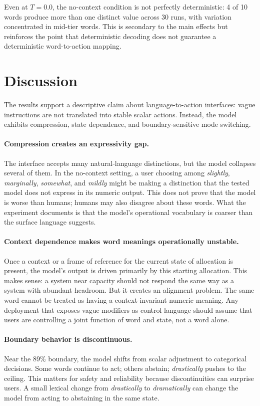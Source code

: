 \documentclass[11pt]{article}
\begin{document}
Even at $T{=}0.0$, the no-context condition is not perfectly deterministic: 4 of 10 words produce more than one distinct value across 30 runs, with variation concentrated in mid-tier words. This is secondary to the main effects but reinforces the point that deterministic decoding does not guarantee a deterministic word-to-action mapping.

\section{Discussion}

The results support a descriptive claim about language-to-action interfaces: vague instructions are not translated into stable scalar actions. Instead, the model exhibits compression, state dependence, and boundary-sensitive mode switching.

\paragraph{Compression creates an expressivity gap.}
The interface accepts many natural-language distinctions, but the model collapses several of them. In the no-context setting, a user choosing among \textit{slightly}, \textit{marginally}, \textit{somewhat}, and \textit{mildly} might be making a distinction that the tested model does not express in its numeric output. This does not prove that the model is worse than humans; humans may also disagree about these words. What the experiment documents is that the model's operational vocabulary is coarser than the surface language suggests.

\paragraph{Context dependence makes word meanings operationally unstable.}
Once a context or a frame of reference for the current state of allocation is present, the model's output is driven primarily by this starting allocation. This makes sense: a system near capacity should not respond the same way as a system with abundant headroom. But it creates an alignment problem. The same word cannot be treated as having a context-invariant numeric meaning. Any deployment that exposes vague modifiers as control language should assume that users are controlling a joint function of word and state, not a word alone.

\paragraph{Boundary behavior is discontinuous.}
Near the 89\% boundary, the model shifts from scalar adjustment to categorical decisions. Some words continue to act; others abstain; \textit{drastically} pushes to the ceiling. This matters for safety and reliability because discontinuities can surprise users. A small lexical change from \textit{drastically} to \textit{dramatically} can change the model from acting to abstaining in the same state.
\end{document}
